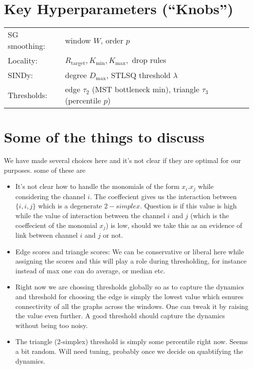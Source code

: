 \documentclass[11pt]{article}
\begin{document}
\section{Key Hyperparameters (``Knobs'')}
\vspace{-0.5em}
\begin{center}
\begin{tabular}{ll}
SG smoothing: & window \(W\), order \(p\) \\
Locality: & \(R_{\text{target}}, K_{\min}, K_{\max}, \) drop rules \\
SINDy: & degree \(D_{\max}\), STLSQ threshold \(\lambda\) \\
Thresholds: & edge \(\tau_2\) (MST bottleneck min), triangle \(\tau_3\) (percentile \(p\)) \\
\end{tabular}
\end{center}
\section{Some of the things to discuss}
We have made several choices here and it's not clear if they are optimal for our purposes. some of these are
\begin{itemize}
	\item It's not clear how to handle the monomials of the form $x_i.x_j$ while considering the channel $i$. The coeffecient gives us the interaction between $\{i,i,j\}$ which is a degenerate $2-simplex$. Question is if this value is high while the value of interaction between the channel $i$ and $j$ (which is the coeffecient of the monomial $x_j$) is low, should we take this as an evidence of link between channel $i$ and $j$ or not.
	\item Edge scores and triangle scores: We can be conservative or liberal here while assigning the scores and this will play a role during thresholding, for instance instead of max one can do average, or median etc.
	\item Right now we are chossing thresholds globally so as to capture the dynamics and threshold for choosing the edge is simply the lowest value which esnures connectivity of all the graphs across the windows. One can tweak it by raising the value even further. A good threshold should capture the dynamics without being too noisy. 
	\item The triangle (2-simplex) threshold is simply some percentile right now. Seems a bit random. Will need tuning, probably once we decide on quabtifying the dynamics.
\end{itemize}

\end{document}

